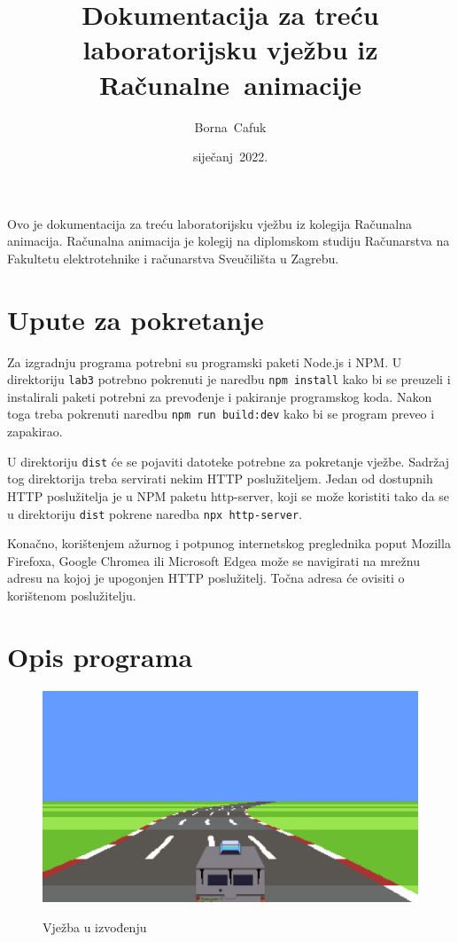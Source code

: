 \documentclass[a4paper]{article}
\title{Dokumentacija za treću laboratorijsku vježbu iz Računalne~animacije}
\author{Borna~Cafuk}
\date{siječanj~2022.}
\begin{document}
\maketitle

Ovo je dokumentacija za treću laboratorijsku vježbu iz kolegija Računalna animacija. Računalna animacija je kolegij na diplomskom studiju Računarstva na Fakultetu elektrotehnike i računarstva Sveučilišta u Zagrebu.

\section{Upute za pokretanje}

Za izgradnju programa potrebni su programski paketi Node.js i NPM. U direktoriju \texttt{lab3} potrebno pokrenuti je naredbu \texttt{npm install} kako bi se preuzeli i instalirali paketi potrebni za prevođenje i pakiranje programskog koda. Nakon toga treba pokrenuti naredbu \texttt{npm run build:dev} kako bi se program preveo i zapakirao.

U direktoriju \texttt{dist} će se pojaviti datoteke potrebne za pokretanje vježbe. Sadržaj tog direktorija treba servirati nekim HTTP poslužiteljem. Jedan od dostupnih HTTP poslužitelja je u NPM paketu http-server, koji se može koristiti tako da se u direktoriju \texttt{dist} pokrene naredba \texttt{npx http-server}.

Konačno, korištenjem ažurnog i potpunog internetskog preglednika poput Mozilla Firefoxa, Google Chromea ili Microsoft Edgea može se navigirati na mrežnu adresu na kojoj je upogonjen HTTP poslužitelj. Točna adresa će ovisiti o korištenom poslužitelju.

\section{Opis programa}

\begin{figure}[h]
	\caption{Vježba u izvođenju}
	\centering
	\includegraphics[width=\textwidth]{screenshot}
	\label{fig:screenshot}
\end{figure}
\end{document}
